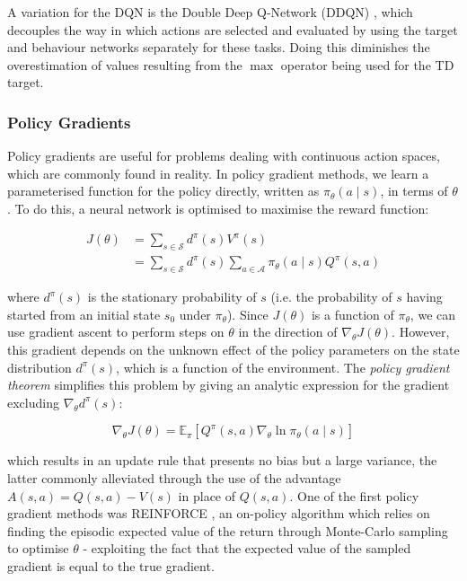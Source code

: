 \documentclass[12pt,twoside]{report}
\begin{document}
\smallskip

A variation for the DQN is the Double Deep Q-Network (DDQN) \cite{DDQN}, which decouples the way in which actions are selected and evaluated by using the target and behaviour networks separately for these tasks. Doing this diminishes the overestimation of values resulting from the $\max$ operator being used for the TD target. 

\subsubsection{Policy Gradients}

Policy gradients are useful for problems dealing with continuous action spaces, which are commonly found in reality. In policy gradient methods, we learn a parameterised function for the policy directly, written as $\pi_\theta(a \! \mid \! s)$, in terms of $\theta$. To do this, a neural network is optimised to maximise the reward function: 

\begin{equation}
\begin{split}
    J(\theta) & = \sum_{s \in \mathcal{S}} d^\pi (s) V^\pi (s) \\
    & = \sum_{s \in \mathcal{S}} d^\pi(s) \sum_{a \in \mathcal{A}} \pi_\theta (a \! \mid \! s) Q^\pi (s,a)
\end{split}
\end{equation}

\noindent where $d^\pi(s)$ is the stationary probability  of $s$ (i.e. the probability of $s$ having started from an initial state $s_0$ under $\pi_\theta$). Since $J(\theta)$ is a function of $\pi_\theta$, we can use gradient ascent to perform steps on $\theta$ in the direction of $\nabla_\theta J(\theta)$. However, this gradient depends on the unknown effect of the policy parameters on the state distribution $d^\pi(s)$, which is a function of the environment. The \textit{policy gradient theorem} \cite{policy-gradients} simplifies this problem by giving an analytic expression for the gradient excluding $\nabla_\theta d^\pi(s)$: 

\begin{equation}
    \nabla_\theta  J(\theta) = \mathbb{E}_\pi \left[Q^\pi(s,a) \nabla_\theta \ln \pi_\theta(a \! \mid \! s) \right]
\end{equation}

\noindent which results in an update rule that presents no bias but a large variance, the latter commonly alleviated through the use of the advantage $A(s,a) = Q(s,a) - V(s)$ in place of $Q(s,a)$. One of the first policy gradient methods was REINFORCE  \cite{Sutton1998}, an on-policy algorithm which relies on finding the episodic expected value of the return through Monte-Carlo sampling to optimise $\theta$ - exploiting the fact that the expected value of the sampled gradient is equal to the true gradient. 
\end{document}
